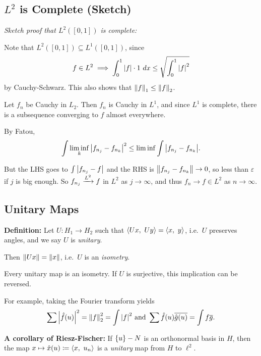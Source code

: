 \hypertarget{l2-is-complete-sketch}{%
\subsection{\texorpdfstring{\(L^2\) is Complete
(Sketch)}{L\^{}2 is Complete (Sketch)}}\label{l2-is-complete-sketch}}

\emph{Sketch proof that \(L^2([0, 1])\) is complete:}

Note that \(L^2([0, 1]) \subseteq L^1([0, 1])\), since
\begin{align*}
f\in L^2 \implies \int_0^1 {\left\lvert {f} \right\rvert} \cdot 1 ~dx \leq \sqrt{\int_0^1 {\left\lvert {f} \right\rvert}^2}
\end{align*} by Cauchy-Schwarz. This also shows that
\({\left\lVert {f} \right\rVert}_1 \leq {\left\lVert {f} \right\rVert}_2\).

Let \(f_n\) be Cauchy in \(L_2\). Then \(f_n\) is Cauchy in \(L^1\), and
since \(L^1\) is complete, there is a subsequence converging to \(f\)
almost everywhere.

By Fatou,
\begin{align*}
\int \liminf_k {\left\lvert {f_{n_j} - f_{n_k}} \right\rvert}^2 \leq \liminf \int {\left\lvert {f_{n_j} - f_{n_k}} \right\rvert}
.\end{align*}

But the LHS goes to \(\int {\left\lvert {f_{n_j} - f} \right\rvert}\) and the RHS is
\({\left\lVert {f_{n_j} - f_{n_k}} \right\rVert} \to 0\), so less than \(\varepsilon\) if
\(j\) is big enough. So \(f_{n_j} \xrightarrow{L^2} f\) in \(L^2\) as
\(j\to\infty\), and thus \(f_n \to f\in L^2\) as \(n\to\infty\).

\hypertarget{unitary-maps}{%
\subsection{Unitary Maps}\label{unitary-maps}}

\textbf{Definition:} Let \(U: H_1 \to H_2\) such that
\({\left\langle {Ux},~{Uy} \right\rangle} = {\left\langle {x},~{y} \right\rangle}\), i.e.~\(U\) preserves angles, and we
say \(U\) is \emph{unitary}.

Then \({\left\lVert {Ux} \right\rVert} = {\left\lVert {x} \right\rVert}\), i.e.~\(U\) is an \emph{isometry}.

Every unitary map is an isometry. If \(U\) is surjective, this
implication can be reversed.

For example, taking the Fourier transform yields
\begin{align*}
\sum {\left\lvert {\hat{f}(u)} \right\rvert}^2 = {\left\lVert {f} \right\rVert}_2^2 = \int{\left\lvert {f} \right\rvert}^2 \text{ and } \sum \hat{f}(u) \overline{\hat{g}(u)} = \int f \overline{g}
.\end{align*}

\textbf{A corollary of Riesz-Fischer:} If \(\left\{{u}\right\}-N\) is an
orthonormal basis in \(H\), then the map
\(x \mapsto \hat{x}(u) \coloneqq {\left\langle {x},~{u_n} \right\rangle}\) is a \emph{unitary}
map from \(H\) to \(\ell^2\).

